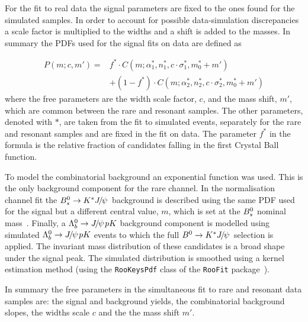 For the fit to real data the signal parameters are fixed to the ones found for the simulated samples.
In order to account for possible data-simulation discrepancies a scale factor is multiplied to the widths
and a shift is added to the masses. In summary the PDFs used for the signal fits on data are defined as

\begin{equation}
\label{eq:DCB_RKst}
\begin{array} {ll}
P(m;c,m') = & f^{*} \cdot C(m;\alpha_1^{*},n_1^{*},c \cdot \sigma_1^{*}, m_0^{*} + m') \\
&+ (1 - f^{*}) \cdot C(m;\alpha_2^{*},n_2^{*},c \cdot \sigma_2^{*}, m_0^{*} + m')
\end{array}
\end{equation}  
\noindent
where the free parameters are the width scale factor, $c$, and the mass shift, $m'$, which are common between the rare
and resonant samples. The other parameters, denoted with $*$, are taken from the fit to simulated events, 
separately for the rare and resonant samples and are fixed in the fit on data.
The parameter $f^{*}$ in the formula is the relative fraction of candidates falling in the first Crystal Ball function.

To model the combinatorial background an exponential function was used.
This is the only background component for the rare channel.
In the normalisation channel fit the $\Bs  \to \Kstar\jpsi$ background
is described using the same PDF used for the signal but a different central value, $m$,
which is set at the ${{B}^0_{s}}$ nominal mass~\cite{PDG2014}.
Finally, a $\Lb\to\jpsi pK$ background component is modelled using simulated $\Lb\to\jpsi pK$ events
to which the full $\Bz \to \Kstar\jpsi$ selection is applied. The invariant mass distribution
of these candidates is a broad shape under the signal peak. The simulated distribution 
is smoothed using a kernel estimation method (using the \verb!RooKeysPdf!  class of the \verb!RooFit! package~\cite{Verkerke:2003ir}).

In summary the free parameters in the simultaneous fit to rare and resonant \mumu data samples are:
the signal and background yields, the combinatorial background slopes, the widths scale $c$ and
the the mass shift $m'$.

